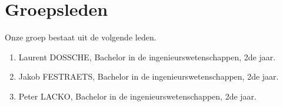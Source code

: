 \section{Groepsleden}
Onze groep bestaat uit de volgende leden.
\begin{enumerate}
 \item Laurent DOSSCHE, Bachelor in de ingenieurswetenschappen, 2de jaar.
 \item Jakob FESTRAETS, Bachelor in de ingenieurswetenschappen, 2de jaar.
 \item Peter LACKO, Bachelor in de ingenieurswetenschappen, 2de jaar.
\end{enumerate}
